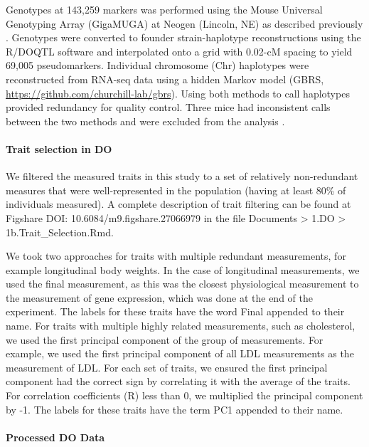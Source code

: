 \documentclass[
]{article}
\begin{document}
Genotypes at 143,259 markers was performed using the Mouse Universal
Genotyping Array (GigaMUGA) \cite{pmid26684931} at Neogen (Lincoln, NE)
as described previously \cite{pmid29567659, pmid22345611}. Genotypes
were converted to founder strain-haplotype reconstructions using the
R/DOQTL software \cite{pmid25237114} and interpolated onto a grid with
0.02-cM spacing to yield 69,005 pseudomarkers. Individual chromosome
(Chr) haplotypes were reconstructed from RNA-seq data using a hidden
Markov model \cite{choi2020genotype} (GBRS,
\url{https://github.com/churchill-lab/gbrs}). Using both methods to call
haplotypes provided redundancy for quality control. Three mice had
inconsistent calls between the two methods and were excluded from the
analysis \cite{pmid29567659}.

\paragraph{Trait selection in DO}\label{trait-selection-in-do}

We filtered the measured traits in this study to a set of relatively
non-redundant measures that were well-represented in the population
(having at least 80\% of individuals measured). A complete description
of trait filtering can be found at Figshare DOI:
10.6084/m9.figshare.27066979 \cite{cube_data} in the file Documents
\textgreater{} 1.DO \textgreater{} 1b.Trait\_Selection.Rmd.

We took two approaches for traits with multiple redundant measurements,
for example longitudinal body weights. In the case of longitudinal
measurements, we used the final measurement, as this was the closest
physiological measurement to the measurement of gene expression, which
was done at the end of the experiment. The labels for these traits have
the word Final appended to their name. For traits with multiple highly
related measurements, such as cholesterol, we used the first principal
component of the group of measurements. For example, we used the first
principal component of all LDL measurements as the measurement of LDL.
For each set of traits, we ensured the first principal component had the
correct sign by correlating it with the average of the traits. For
correlation coefficients (R) less than 0, we multiplied the principal
component by -1. The labels for these traits have the term PC1 appended
to their name.

\paragraph{Processed DO Data}\label{processed-do-data}
\end{document}
